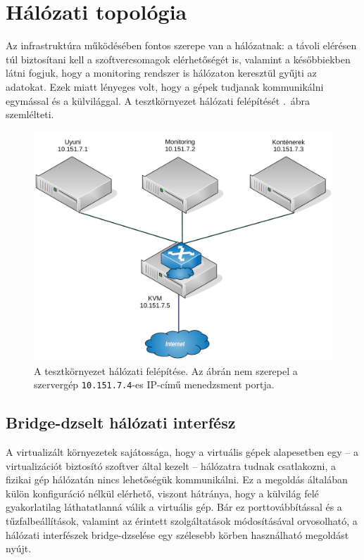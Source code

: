 \section{Hálózati topológia}
Az infrastruktúra működésében fontos szerepe van a hálózatnak: a távoli elérésen túl biztosítani kell a szoftvercsomagok elérhetőségét is, valamint a későbbiekben látni fogjuk, hogy a monitoring rendszer is hálózaton keresztül gyűjti az adatokat. Ezek miatt lényeges volt, hogy a gépek tudjanak kommunikálni egymással és a külvilággal. A tesztkörnyezet hálózati felépítését .~ábra szemlélteti.

\begin{figure}[ht]
	\centering
	\includegraphics[width=15cm]{figures/halozat.pdf}
	\caption{A tesztkörnyezet hálózati felépítése. Az ábrán nem szerepel a szervergép \texttt{10.151.7.4}-es IP-című menedzsment portja.}
	\label{fig:test-env-network}
\end{figure}

\subsection{Bridge-dzselt hálózati interfész}
\label{sect:net-bridge}
A virtualizált környezetek sajátossága, hogy a virtuális gépek alapesetben egy -- a virtualizációt biztosító szoftver által kezelt -- hálózatra tudnak csatlakozni, a fizikai gép hálózatán nincs lehetőségük kommunikálni. Ez a megoldás általában külön konfiguráció nélkül elérhető, viszont hátránya, hogy a külvilág felé gyakorlatilag láthatatlanná válik a virtuális gép. Bár ez porttovábbítással és a tűzfalbeállítások, valamint az érintett szolgáltatások módosításával orvosolható, a hálózati interfészek bridge-dzselése egy szélesebb körben használható megoldást nyújt.

